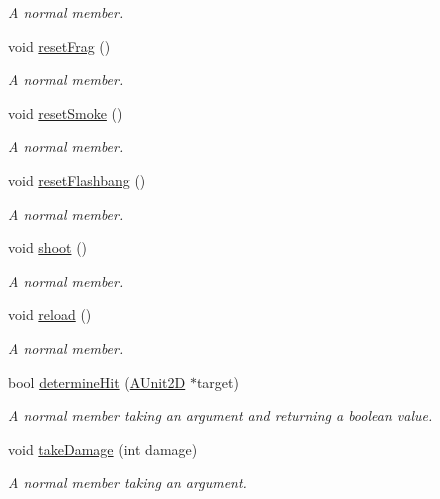 \begin{DoxyCompactItemize}
\begin{DoxyCompactList}\small\item\em A normal member. \end{DoxyCompactList}\item 
void \hyperlink{class_a_unit2_d_a895149436f783d3c0bbfe80556196438}{reset\+Frag} ()
\begin{DoxyCompactList}\small\item\em A normal member. \end{DoxyCompactList}\item 
void \hyperlink{class_a_unit2_d_a80ad176a4ed566c1fb18df231290c8b4}{reset\+Smoke} ()
\begin{DoxyCompactList}\small\item\em A normal member. \end{DoxyCompactList}\item 
void \hyperlink{class_a_unit2_d_a509be02c409aec4f9db70eedc954dec8}{reset\+Flashbang} ()
\begin{DoxyCompactList}\small\item\em A normal member. \end{DoxyCompactList}\item 
void \hyperlink{class_a_unit2_d_a6cbf098b221157bb99dc278b3c8dab70}{shoot} ()
\begin{DoxyCompactList}\small\item\em A normal member. \end{DoxyCompactList}\item 
void \hyperlink{class_a_unit2_d_a4e21cbdac89dcc72f670ad77dfc474cb}{reload} ()
\begin{DoxyCompactList}\small\item\em A normal member. \end{DoxyCompactList}\item 
bool \hyperlink{class_a_unit2_d_aec8aadc1698c1a0e26d76ce97b2515d0}{determine\+Hit} (\hyperlink{class_a_unit2_d}{A\+Unit2D} $\ast$target)
\begin{DoxyCompactList}\small\item\em A normal member taking an argument and returning a boolean value. \end{DoxyCompactList}\item 
void \hyperlink{class_a_unit2_d_a383ec068bf651417a27c4e7f9a44ce1c}{take\+Damage} (int damage)
\begin{DoxyCompactList}\small\item\em A normal member taking an argument. \end{DoxyCompactList}\item 

\end{DoxyCompactItemize}
